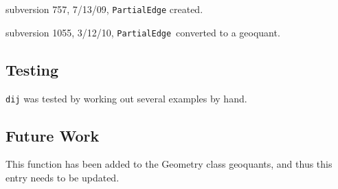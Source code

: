 subversion 757, 7/13/09, \texttt{PartialEdge} created.

subversion 1055, 3/12/10, \texttt{PartialEdge}\ converted to a geoquant.

\subsection*{Testing}

\texttt{dij} was tested by working out several examples by hand.

\subsection*{Future Work}

This function has been added to the Geometry class geoquants, and thus this
entry needs to be updated.
